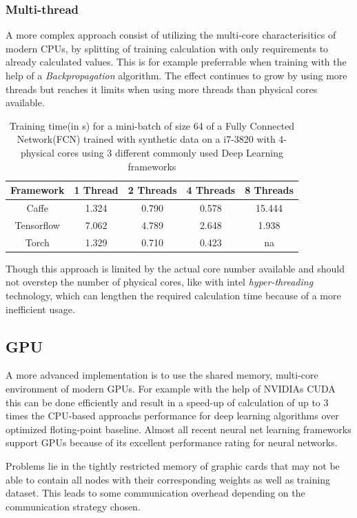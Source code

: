 \documentclass[conference]{IEEEtran}
\begin{document}
\subsubsection{Multi-thread}
A more complex approach consist of utilizing the multi-core characterisitics of modern CPUs, by splitting of training calculation with only requirements to already calculated values. This is for example preferrable when training with the help of a \emph{Backpropagation} algorithm. The effect  continues to grow by using more threads but reaches it limits when using more threads than physical cores available.

\begin{table} 
\centering
\begin{tabular}{c c c c c}
\hline
Framework & 1 Thread & 2 Threads &4 Threads & 8 Threads\\\hline
Caffe & 1.324 & 0.790 & 0.578 & 15.444 \\
Tensorflow & 7.062 & 4.789 & 2.648 & 1.938 \\
Torch & 1.329 & 0.710 & 0.423 & na \\\hline
\end{tabular}
\caption{Training time(in s) for a mini-batch of size 64 of a Fully Connected Network(FCN) trained with synthetic data on a i7-3820 with 4-physical cores using 3 different commonly used Deep Learning frameworks\cite{shi2016benchmarking}}
\label{fig_ttfcn}
\end{table}

Though this approach is limited by the actual core number available and should not overstep the number of physical cores, like with intel \emph{hyper-threading} technology, which can lengthen the required calculation time because of a more inefficient usage\cite{shi2016benchmarking}.


\subsection{GPU}
A more advanced implementation is to use the shared memory, multi-core environment of modern GPUs. For example with the help of  NVIDIAs CUDA this can be done efficiently and result in a speed-up of calculation of up to 3 times the CPU-based approachs performance for deep learning algorithms over optimized floting-point baseline\cite{shi2016benchmarking}. Almost all recent neural net learning frameworks support GPUs because of its excellent performance rating for neural networks.

Problems lie in the tightly restricted memory of graphic cards that may not be able to contain all nodes with their corresponding weights as well as training dataset. This leads to some communication overhead depending on the communication strategy chosen.
\end{document}
